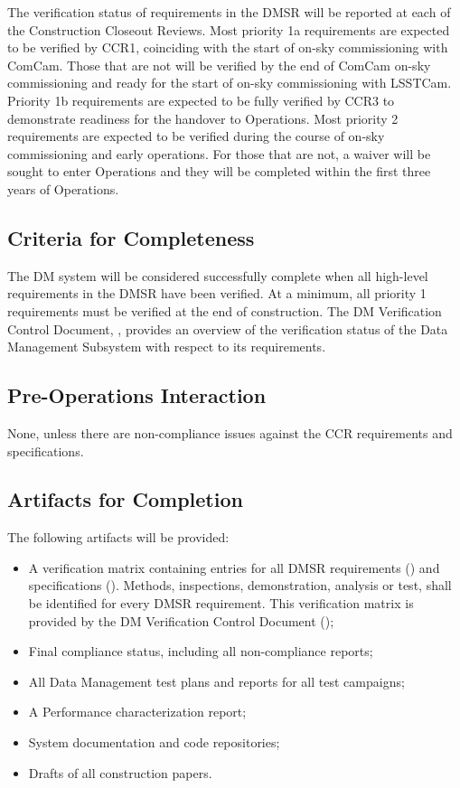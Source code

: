 The verification status of requirements in the DMSR will be reported at each of the Construction Closeout Reviews.
Most priority 1a requirements are expected to be verified by CCR1, coinciding with the start of on-sky commissioning with ComCam. Those that are not will be verified by the end of ComCam on-sky commissioning and ready for the start of on-sky commissioning with LSSTCam.
Priority 1b requirements are expected to be fully verified by CCR3 to demonstrate readiness for the handover to Operations.
Most priority 2 requirements are expected to be verified during the course of on-sky commissioning and early operations. For those that are not, a waiver will be sought to enter Operations and they will be completed within the first three years of Operations.

\subsection{Criteria for Completeness} \label{sec:dm-completeness}
The DM system will be considered successfully complete when all high-level requirements in the DMSR have been verified.
At a minimum, all priority 1 requirements must be verified at the end of construction.
The DM Verification Control Document, ,  provides an overview of the verification status of the Data Management Subsystem with respect to its requirements.

\subsection{Pre-Operations Interaction}
None, unless there are non-compliance issues against the CCR requirements and specifications.

\subsection{Artifacts for Completion} \label{sec:dm-artifacts}
The following artifacts will be provided:
\begin{itemize}
	\item A verification matrix containing entries for all DMSR requirements () and specifications (). Methods, inspections, demonstration, analysis or test, shall be identified for every DMSR requirement. This verification matrix is provided by the DM Verification Control Document ();
	\item Final compliance status, including all non-compliance reports;
	\item All Data Management test plans and reports for all test campaigns;
	\item A Performance characterization report;
	\item System documentation and code repositories;
	\item Drafts of all construction papers.
\end{itemize}


